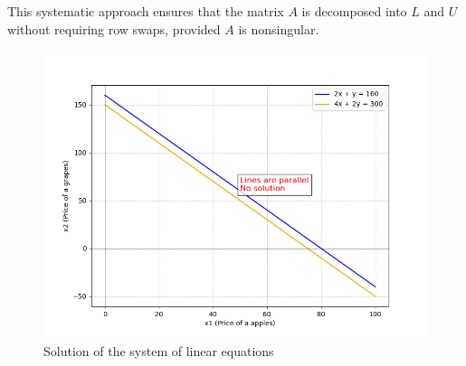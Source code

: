 \documentclass[journal]{IEEEtran}
\begin{document}
This systematic approach ensures that the matrix \( A \) is decomposed into \( L \) and \( U \) without requiring row swaps, provided \( A \) is nonsingular.

	\begin{figure}[h!]
		\centering
		\includegraphics[width=\columnwidth]{figs/fig1.png}
		\caption{Solution of the system of linear equations}
		\label{stemplot}
	\end{figure}
	
\end{document}
